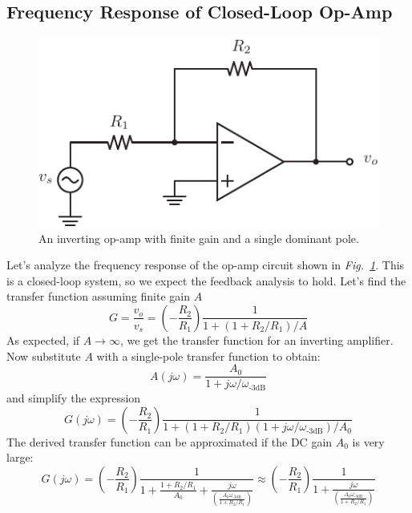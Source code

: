 \subsection{Frequency Response of Closed-Loop Op-Amp}
\begin{figure}[tb]
\centering
\includegraphics[scale=1]{opamp_invert_gain}
\caption{An inverting op-amp with finite gain and a single dominant pole.}
\label{fig:opamp_invert_gain}
\end{figure}
Let's analyze the frequency response of the op-amp circuit shown in \emph{Fig.~\ref{fig:opamp_invert_gain}}.  This is a closed-loop system, so we expect the feedback analysis to hold.  Let's find the transfer function assuming finite gain $A$
    \begin{equation}
        G = \frac{v_o}{v_s} = \left(-\frac{R_2}{R_1}\right) \frac{1}{1 + (1+R_2/R_1)/A}
    \end{equation}
As expected, if $A \rightarrow \infty$, we get the transfer function for an inverting amplifier.  Now  substitute $A$ with a single-pole transfer function to obtain:
    \begin{equation} 
        A(j\omega) = \frac{A_0}{1 + j\omega/\omega_{\text{-3dB}}}
    \end{equation}
and simplify the expression 
    \begin{equation}
        G(j\omega) = \left(-\frac{R_2}{R_1}\right)  \frac{1}{1 + (1+R_2/R_1)(1+ j\omega/\omega_\text{-3dB})/A_0}
    \end{equation}
The derived transfer function can be approximated if the DC gain $A_0$ is very large:
    \begin{equation}
        G(j\omega) = \left(-\frac{R_2}{R_1}\right)  \frac{1}{1 + \frac{1+R_2/R_1}{A_0} + \frac{j\omega}{\left( \frac{A_0 \omega_\text{-3dB}}{1 + R_2/R_1} \right)}} \approx \left(-\frac{R_2}{R_1}\right)\frac{1}{1 + \frac{j\omega}{\left( \frac{A_0 \omega_\text{-3dB}}{1 + R_2/R_1} \right)}}
    \end{equation}
